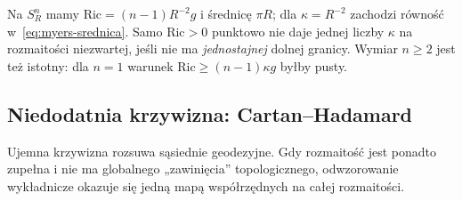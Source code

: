 \begin{przyklad}
Na $S_R^n$ mamy
$\mathrm{Ric}=(n-1)R^{-2}g$ i średnicę
$\pi R$; dla $\kappa=R^{-2}$ zachodzi
równość w~\eqref{eq:myers-srednica}.
Samo $\mathrm{Ric}>0$ punktowo nie daje
jednej liczby $\kappa$ na rozmaitości
niezwartej, jeśli nie ma \emph{jednostajnej}
dolnej granicy. Wymiar $n\geq2$ jest też
istotny: dla $n=1$ warunek
$\mathrm{Ric}\geq(n-1)\kappa g$ byłby pusty.
\end{przyklad}

\subsection*{Niedodatnia krzywizna: Cartan--Hadamard}

Ujemna krzywizna rozsuwa sąsiednie geodezyjne.
Gdy rozmaitość jest ponadto zupełna i nie ma
globalnego „zawinięcia” topologicznego,
odwzorowanie wykładnicze okazuje się
jedną mapą współrzędnych na całej rozmaitości.

